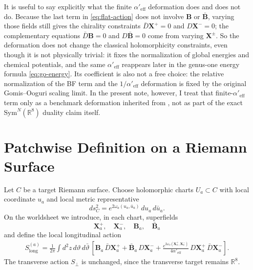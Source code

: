 \documentclass[11pt]{article}
\newcommand{\Aeff}{\alpha'_{\mathrm{eff}}}
\newcommand{\Sym}{\mathrm{Sym}}
\newcommand{\bR}{\mathbb{R}}
\begin{document}
It is useful to say explicitly what the finite $\Aeff$ deformation does and does not do. Because the last term in \eqref{eq:flat-action} does not involve $\mathbf B$ or $\bar{\mathbf B}$, varying those fields still gives the chirality constraints $\bar D\mathbf X^+=0$ and $D\mathbf X^-=0$; the complementary equations $\bar D\mathbf B=0$ and $D\bar{\mathbf B}=0$ come from varying $\mathbf X^\pm$. So the deformation does not change the classical holomorphicity constraints, even though it is not physically trivial: it fixes the normalization of global energies and chemical potentials, and the same $\Aeff$ reappears later in the genus-one energy formula \eqref{eq:go-energy}. Its coefficient is also not a free choice: the relative normalization of the BF term and the $1/\Aeff$ deformation is fixed by the original Gomis--Ooguri scaling limit. In the present note, however, I treat that finite-$\Aeff$ term only as a benchmark deformation inherited from \cite{gomis2000nonrelativisticclosedstringtheory}, not as part of the exact $\Sym^N(\bR^8)$ duality claim itself.

\section{Patchwise Definition on a Riemann Surface}
Let $C$ be a target Riemann surface. Choose holomorphic charts $U_a\subset C$ with local coordinate $u_a$ and local metric representative
\begin{equation}\label{eq:local-target-metric}
ds_C^2=e^{2\omega_a(u_a,\bar u_a)}\,du_a\,d\bar u_a.
\end{equation}
On the worldsheet we introduce, in each chart, superfields
\begin{equation}\label{eq:local-target-fields}
\mathbf X^+_a,\quad \mathbf X^-_a,\quad \mathbf B_a,\quad \bar{\mathbf B}_a
\end{equation}
and define the local longitudinal action
\begin{equation}\label{eq:curved-local-action}
\begin{aligned}
S^{(a)}_{\mathrm{long}}
=
\frac{1}{2\pi}\int d^2z\,d\vartheta\,d\bar\vartheta\,
\left[
\mathbf B_a\,\bar D\mathbf X^+_a
+\bar{\mathbf B}_a\,D\mathbf X^-_a
+\frac{e^{2\omega_a(\mathbf X_a^+,\mathbf X_a^-)}}{4\Aeff}\,
D\mathbf X^+_a\,\bar D\mathbf X^-_a
\right].
\end{aligned}
\end{equation}
The transverse action $S_\perp$ is unchanged, since the transverse target remains $\bR^8$.
\end{document}
